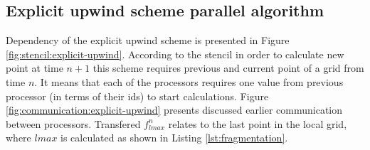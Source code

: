 \subsection{Explicit upwind scheme parallel algorithm} \label{s:general-approach:explicit-upwind-parallel-algorithm}
	Dependency of the explicit upwind scheme is presented in Figure \ref{fig:stencil:explicit-upwind}. According to the \gls{stencil} in order to calculate new point at time $n+1$ this scheme requires previous and current point of a grid from time $n$. It means that each of the processors requires one value from previous processor (in terms of their ids) to start calculations. Figure \ref{fig:communication:explicit-upwind} presents discussed earlier communication between processors. Transfered $f_{lmax}^{n}$ relates to the last point in the local grid, where $lmax$ is calculated as shown in Listing \ref{lst:fragmentation}.
